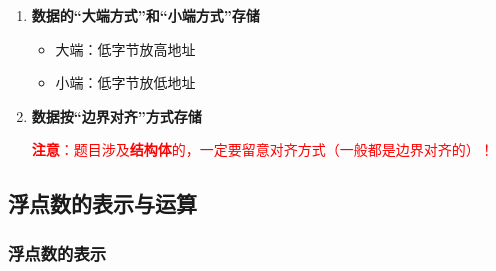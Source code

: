 \documentclass[12pt, a4paper, oneside]{ctexart}
\begin{document}
\begin{enumerate}
  \item {\bf 数据的“大端方式”和“小端方式”存储}
  \begin{itemize}
    \item 大端：低字节放高地址
    \item 小端：低字节放低地址
  \end{itemize}
  \item {\bf 数据按“边界对齐”方式存储}
  
  \textcolor{red}{\textbf{注意}：题目涉及\textbf{结构体}的，一定要留意对齐方式（一般都是边界对齐的）！}
\end{enumerate}

\subsection{浮点数的表示与运算}

\subsubsection{浮点数的表示}
\end{document}

